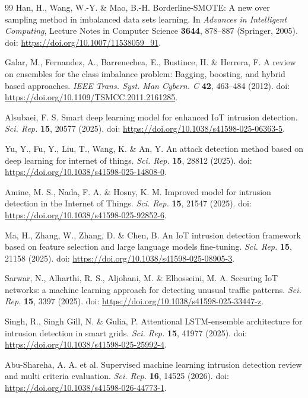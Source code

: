 \documentclass[fleqn,10pt]{wlscirep}
\begin{document}
\begin{thebibliography}{99}
Han, H., Wang, W.-Y. \& Mao, B.-H. Borderline-SMOTE: A new over sampling method in imbalanced data sets learning. In \emph{Advances in Intelligent Computing}, Lecture Notes in Computer Science \textbf{3644}, 878--887 (Springer, 2005). doi: \url{https://doi.org/10.1007/11538059_91}.

Galar, M., Fernandez, A., Barrenechea, E., Bustince, H. \& Herrera, F. A review on ensembles for the class imbalance problem: Bagging, boosting, and hybrid based approaches. \emph{IEEE Trans. Syst. Man Cybern. C} \textbf{42}, 463--484 (2012). doi: \url{https://doi.org/10.1109/TSMCC.2011.2161285}.

Alsubaei, F. S. Smart deep learning model for enhanced IoT intrusion detection. \emph{Sci. Rep.} \textbf{15}, 20577 (2025). doi: \url{https://doi.org/10.1038/s41598-025-06363-5}.

Yu, Y., Fu, Y., Liu, T., Wang, K. \& An, Y. An attack detection method based on deep learning for internet of things. \emph{Sci. Rep.} \textbf{15}, 28812 (2025). doi: \url{https://doi.org/10.1038/s41598-025-14808-0}.

Amine, M. S., Nada, F. A. \& Hosny, K. M. Improved model for intrusion detection in the Internet of Things. \emph{Sci. Rep.} \textbf{15}, 21547 (2025). doi: \url{https://doi.org/10.1038/s41598-025-92852-6}.

Ma, H., Zhang, W., Zhang, D. \& Chen, B. An IoT intrusion detection framework based on feature selection and large language models fine-tuning. \emph{Sci. Rep.} \textbf{15}, 21158 (2025). doi: \url{https://doi.org/10.1038/s41598-025-08905-3}.

Sarwar, N., Alharthi, R. S., Aljohani, M. \& Elhosseini, M. A. Securing IoT networks: a machine learning approach for detecting unusual traffic patterns. \emph{Sci. Rep.} \textbf{15}, 3397 (2025). doi: \url{https://doi.org/10.1038/s41598-025-33447-z}.

Singh, R., Singh Gill, N. \& Gulia, P. Attentional LSTM-ensemble architecture for intrusion detection in smart grids. \emph{Sci. Rep.} \textbf{15}, 41977 (2025). doi: \url{https://doi.org/10.1038/s41598-025-25992-4}.

Abu-Shareha, A. A. et al. Supervised machine learning intrusion detection review and multi criteria evaluation. \emph{Sci. Rep.} \textbf{16}, 14525 (2026). doi: \url{https://doi.org/10.1038/s41598-026-44773-1}.


\end{thebibliography}
\end{document}
